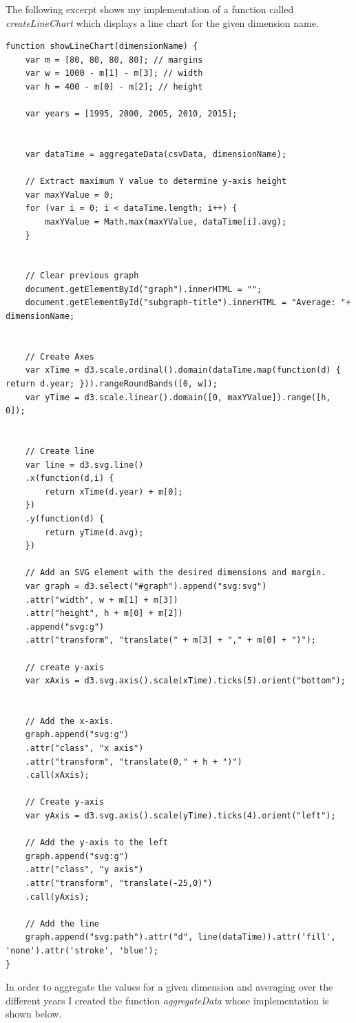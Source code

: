 \documentclass[]{article}
\begin{document}
The following excerpt shows my implementation of a function called \emph{createLineChart} which displays a line chart for the given dimension name.
\begin{lstlisting}[caption=createLineChart Function]
function showLineChart(dimensionName) {
	var m = [80, 80, 80, 80]; // margins
	var w = 1000 - m[1] - m[3]; // width
	var h = 400 - m[0] - m[2]; // height
	
	var years = [1995, 2000, 2005, 2010, 2015];
	
	
	var dataTime = aggregateData(csvData, dimensionName);
	
	// Extract maximum Y value to determine y-axis height
	var maxYValue = 0;
	for (var i = 0; i < dataTime.length; i++) {
		maxYValue = Math.max(maxYValue, dataTime[i].avg);
	} 
	
	
	// Clear previous graph 
	document.getElementById("graph").innerHTML = "";
	document.getElementById("subgraph-title").innerHTML = "Average: "+ dimensionName;
	
	
	// Create Axes
	var xTime = d3.scale.ordinal().domain(dataTime.map(function(d) { return d.year; })).rangeRoundBands([0, w]);
	var yTime = d3.scale.linear().domain([0, maxYValue]).range([h, 0]);
	
	
	// Create line
	var line = d3.svg.line()
	.x(function(d,i) { 
		return xTime(d.year) + m[0]; 
	})
	.y(function(d) { 
		return yTime(d.avg); 
	})
	
	// Add an SVG element with the desired dimensions and margin.
	var graph = d3.select("#graph").append("svg:svg")
	.attr("width", w + m[1] + m[3])
	.attr("height", h + m[0] + m[2])
	.append("svg:g")
	.attr("transform", "translate(" + m[3] + "," + m[0] + ")");
	
	// create y-axis
	var xAxis = d3.svg.axis().scale(xTime).ticks(5).orient("bottom");
	
	
	// Add the x-axis.
	graph.append("svg:g")
	.attr("class", "x axis")
	.attr("transform", "translate(0," + h + ")")
	.call(xAxis);
	
	// Create y-axis
	var yAxis = d3.svg.axis().scale(yTime).ticks(4).orient("left");
	
	// Add the y-axis to the left
	graph.append("svg:g")
	.attr("class", "y axis")
	.attr("transform", "translate(-25,0)")
	.call(yAxis);
	
	// Add the line
	graph.append("svg:path").attr("d", line(dataTime)).attr('fill', 'none').attr('stroke', 'blue');
}
\end{lstlisting}

In order to aggregate the values for a given dimension and averaging over the different years I created the function \emph{aggregateData} whose implementation is shown below. 
\end{document}
